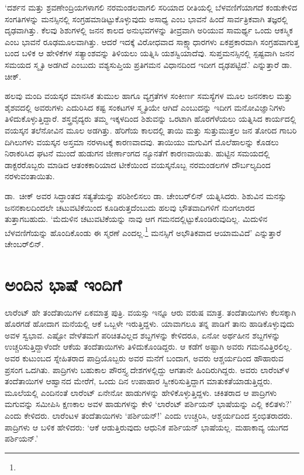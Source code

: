 ‘ದರ್ಶನ ಮತ್ತು ಶ್ರವಣೇಂದ್ರಿಯಗಳಾಗಲಿ ನರಮಂಡಲವಾಗಲಿ ಸರಿಯಾದ ರೀತಿಯಲ್ಲಿ ಬೆಳವಣಿಗೆಯಾಗದೆ ಕಂಡುಕೇಳಿದ ಸಂಗತಿಗಳನ್ನು ಮನಸ್ಸಿನಲ್ಲಿ ಸಂಗ್ರಹಮಾಡಿಟ್ಟುಕೊಳ್ಳುವುದು ಅಸಾಧ್ಯ ಎಂಬ ಭಾವನೆ ಹಿಂದೆ ಸಾರ್ವತ್ರಿಕವಾಗಿ ತಜ್ಞರಲ್ಲಿ ದೃಢವಾಗಿತ್ತು. ಕೆಲವು ಶಿಶುಗಳಲ್ಲಿ ಜನನ ಕಾಲದ ಅನುಭವಗಳನ್ನು ತೀವ್ರವಾಗಿ ಅರಿಯುವ ಸಾಮರ್ಥ್ಯ ಒಂದು ಆಕಸ್ಮಿಕ ಎಂಬ ಭಾವನೆ ರೂಢಮೂಲವಾಗಿತ್ತು. ಆದರೆ ಇದಕ್ಕೆ ವಿರೋಧವಾದ ಸಾಕ್ಷ್ಯಾಧಾರಗಳು ಏಕಪ್ರಕಾರವಾಗಿ ಸಂಗ್ರಹವಾಗುತ್ತ ಬಂದ ಬಳಿಕ ಆ ಹೇಳಿಕೆಗಳ ಸತ್ಯಾಂಶವನ್ನು ತಿಳಿಯಲು ಯತ್ನಿಸಿ ಯಶಸ್ವಿಯಾದೆವು. ಸುಪ್ತಮನಸ್ಸಿನಲ್ಲಿ ಸ್ಪಷ್ಟವಾಗಿ ಜನನ ಸಮಯದ ಸ್ಮೃತಿ ಅಡಗಿದೆ ಎಂಬುದು ವಶ್ಯಸುಪ್ತಿಯ ಪ್ರತಿ\-ಗಮನ ವಿಧಾನದಿಂದ ಇದೀಗ ದೃಢಪಟ್ಟಿದೆ.’ ಎನ್ನುತ್ತಾರೆ ಡಾ. ಚೀಕ್.

ಹಲವು ಮಂದಿ ವಯಸ್ಕರ ಮಾನಸಿಕ ತುಮುಲ ಹಾಗೂ ವ್ಯಗ್ರತೆಗಳ ಸಂಕೀರ್ಣ ಸಮಸ್ಯೆಗಳ ಮೂಲ ಜನನಕಾಲ ಮತ್ತು ಶೈಶವದಲ್ಲಿ ಅವರುಗಳು ಎದುರಿಸಿದ ಕಷ್ಟ ಸಂಕಟಗಳ ಸ್ಮೃತಿಯೇ ಆಗಿದೆ ಎಂಬುದನ್ನು ಇದೀಗ ಮನೋವಿಜ್ಞಾನಿಗಳು ತಿಳಿದುಕೊಳ್ಳುತ್ತಿದ್ದಾರೆ. ಶಸ್ತ್ರವೈದ್ಯರು ತಮ್ಮ ಇಕ್ಕಳದಿಂದ ಶಿಶುವನ್ನು ಒರಟಾಗಿ ಹೊರಗೆಳೆಯಲು ಯತ್ನಿಸಿದ ಕಾರ್ಯದಲ್ಲಿ ವಯಸ್ಕನ ತಲೆನೋವಿನ ಮೂಲ ಅಡಗಿತ್ತು. ಹೆರಿಗೆಯ ಕಾಲದಲ್ಲಿ ತಾಯಿ ಮತ್ತು ಸುತ್ತುಮುತ್ತಲ ಜನ ತೋರಿದ ಗಾಬರಿ ದಿಗಿಲುಗಳು ವಯಸ್ಕನ ಅಸ್ತಮಾ ನರಳಾಟಕ್ಕೆ ಕಾರಣವಾದವು. ತಾಯಿಯು ಮಗುವಿಗೆ ಮೊಲೆಹಾಲನ್ನು ಕೊಡಲು ನಿರಾಕರಿಸಿದ ಘಟನೆ ಮುಂದೆ ಹುಡುಗನ ಜೀರ್ಣಾಂಗದ ನ್ಯೂನತೆಗೆ ಕಾರಣವಾಯಿತು. ಹುಟ್ಟಿನ ಸಮಯದಲ್ಲಿ ಡಾಕ್ಟರರೊಬ್ಬರು ಮಾಡಿದ ಆತಂಕಕಾರಿಯಾದ ಟೀಕೆಯಿಂದ ವಯಸ್ಕನೊಬ್ಬ ನರಮಂಡಲಗಳ ದೌರ್ಬಲ್ಯದಿಂದ ನರಳುವಂತಾಯಿತು.

ಡಾ.\ ಚೀಕ್ ಅವರ ಸಿದ್ಧಾಂತದ ಸತ್ಯತೆಯನ್ನು ಪರಿಶೀಲಿಸಲು ಡಾ. ಚೇಂಬರ್​ಲಿನ್ ಯತ್ನಿಸಿದರು. ಶಿಶುವಿನ ಮನಸ್ಸು ಜನನಕಾಲದಿಂದಲೇ ಚಟುವಟಿಕೆಯಿಂದ ಕೂಡಿರುತ್ತದೆಂಬುದು ಹಲವು ಭೌತವಾದಿಗಳಿಗೆ ನುಂಗಲಾರದ ತುತ್ತಾಗಬಹುದು. ‘ಮೆದುಳಿನ ಚಟುವಟಿಕೆಯನ್ನು ನಾವು ಆಗ ಗಮನದಲ್ಲಿಟ್ಟುಕೊಂಡಿರುವುದಿಲ್ಲ. ಮಿದುಳಿನ ಬೆಳವಣಿಗೆಯನ್ನು ಹೊಂದಿಕೊಂಡು ಈ ಸ್ಮರಣೆ ಎಂದಲ್ಲ.\footnote{\hfill{}} ಮನಸ್ಸಿಗೆ ಅಭೌತಿಕವಾದ ಆಯಾಮವಿದೆ’ ಎನ್ನುತ್ತಾರೆ ಚೇಂಬರ್​ಲಿನ್.


\section*{ಅಂದಿನ ಭಾಷೆ ಇಂದಿಗೆ}


ಲಾರೆಂಟ್ ಹೇ ತಂದೆತಾಯಿಗಳ ಏಕಮಾತ್ರ ಪುತ್ರಿ. ವಯಸ್ಸು ಇನ್ನೂ ಆರು ವರುಷ ಮಾತ್ರ. ತಂದೆತಾಯಿಗಳು ಕೆಲಸಕ್ಕಾಗಿ ಹೊರಗಡೆ ಹೋದಾಗ ಮನೆಯಲ್ಲಿ ಆಕೆ ಒಬ್ಬಳೇ ಇರುತ್ತಿದ್ದಳು. ಯಾವಾಗಲೂ ತನ್ನ ಪಾಡಿಗೆ ತಾನು ಹಾಡಿಕೊಳ್ಳುವುದು ಅವಳ ಸ್ವಭಾವ. ಎಷ್ಟೋ ವೇಳೆ\break ತಮಗೆ ಪರಿಚಿತವಿಲ್ಲದ ಶಬ್ದಗಳನ್ನು ಕೇಳಿದರೂ, ಏನೋ ಅರ್ಥಹೀನ ಶಬ್ದಗಳನ್ನು ಉಚ್ಚರಿಸು\-ತ್ತಿದ್ದಾಳೆಂದೇ ಆಕೆಯ ತಂದೆತಾಯಿಗಳು ತಿಳಿದುಕೊಂಡಿದ್ದರು. ಆ ಕಡೆಗೆ ಅಷ್ಟಾಗಿ ಅವರು ಗಮನವಿತ್ತಿರಲಿಲ್ಲ. ಅವರ ಕುಟುಂಬದ ಸ್ನೇಹಿತರಾದ ಪಾದ್ರಿಯೊಬ್ಬರು ಅವರ ಮನೆಗೆ ಬಂದಾಗ, ಅವರು ಆಶ್ಚರ್ಯದಿಂದ ಹೌಹಾರುವ ಪ್ರಸಂಗ ಒದಗಿತು. ಪಾದ್ರಿಗಳು ಬಹುಕಾಲ ಪೌರಸ್ತ್ಯ ದೇಶಗಳಲ್ಲಿದ್ದು ಆಗತಾನೇ ಹಿಂದಿರುಗಿದ್ದರು. ಅವರು ಲಾರೆಂಟ್​ಳ ತಂದೆತಾಯಿಗಳ ಆಹ್ವಾನದ ಮೇರೆಗೆ, ಒಂದು ದಿನ ಉಪಾಹಾರ ಸ್ವೀಕರಿಸುತ್ತಿದ್ದಾಗ ಮಾತುಕತೆಯಾಡುತ್ತಿದ್ದರು. ಮೂಲೆಯಲ್ಲಿ ಎಂದಿನಂತೆ ಲಾರೆಂಟ್ ಏನೇನೋ ಹಾಡುಗಳನ್ನು ಹೇಳಿಕೊಳ್ಳುತ್ತಿದ್ದಳು. ಚಕಿತರಾದ ಆ ಪಾದ್ರಿಗಳು ಮಗುವನ್ನು ಸಮೀಪಿಸಿ ಕ್ಷಣಕಾಲ ಅವಳ ಹಾಡುಗಳನ್ನು ಕೇಳಿ ‘ಲಾರೆಂಟ್ ಪರ್ಶಿಯನ್ ಭಾಷೆಯನ್ನು ಎಲ್ಲಿ ಕಲಿತಳು?’ ಎಂದು ಕೇಳಿದರು. ಲಾರೆಂಟಳ ತಂದೆತಾಯಿಗಳು ‘ಪರ್ಶಿಯನ್​!’ ಎಂದು ಉಚ್ಚರಿಸಿ, ಆಶ್ಚರ್ಯದಿಂದ ಸ್ತಂಭಿತರಾದರು. ಪಾದ್ರಿಗಳು ಆ ಬಳಿಕ ಹೇಳಿದರು: ‘ಆಕೆ ಆಡುತ್ತಿರುವುದು ಆಧುನಿಕ ಪರ್ಶಿಯನ್ ಭಾಷೆಯಲ್ಲ. ಮಹಾಕಾವ್ಯ ಯುಗದ ಪರ್ಶಿಯನ್.’

